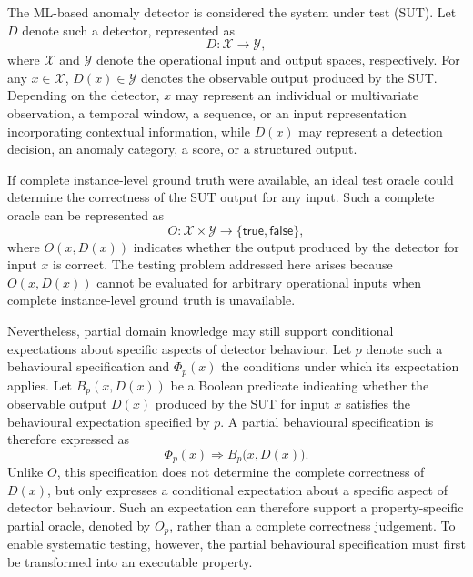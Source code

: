 \documentclass[preprint,12pt]{elsarticle}
\begin{document}
The ML-based anomaly detector is considered the system under test (SUT).
Let \(D\) denote such a detector, represented as
\begin{equation}
    D : \mathcal{X} \rightarrow \mathcal{Y},
    \label{eq:sut}
\end{equation}
where \(\mathcal{X}\) and \(\mathcal{Y}\) denote the operational input and
output spaces, respectively. For any \(x \in \mathcal{X}\),
\(D(x) \in \mathcal{Y}\) denotes the observable output produced by the SUT.
Depending on the detector, \(x\) may represent an individual or multivariate
observation, a temporal window, a sequence, or an input representation
incorporating contextual information, while \(D(x)\) may represent a
detection decision, an anomaly category, a score, or a structured output.

If complete instance-level ground truth were available, an ideal test oracle
could determine the correctness of the SUT output for any input. Such a
complete oracle can be represented as
\begin{equation}
    O :
    \mathcal{X} \times \mathcal{Y}
    \rightarrow
    \{\mathsf{true},\mathsf{false}\},
    \label{eq:complete_oracle}
\end{equation}
where \(O(x,D(x))\) indicates whether the output produced by the detector for
input \(x\) is correct. The testing problem addressed here arises because
\(O(x,D(x))\) cannot be evaluated for arbitrary operational inputs when
complete instance-level ground truth is unavailable.

Nevertheless, partial domain knowledge may still support conditional
expectations about specific aspects of detector behaviour. Let \(p\)
denote such a behavioural specification and \(\Phi_p(x)\) the conditions
under which its expectation applies. Let \(B_p(x,D(x))\) be a Boolean predicate indicating whether the
observable output \(D(x)\) produced by the SUT for input \(x\) satisfies the
behavioural expectation specified by \(p\). A partial behavioural
specification is therefore expressed as
\begin{equation}
    \Phi_p(x)
    \Rightarrow
    B_p\bigl(x,D(x)\bigr).
    \label{eq:behavioural_specification}
\end{equation}
Unlike \(O\), this specification does not determine the complete correctness
of \(D(x)\), but only expresses a conditional expectation about a specific
aspect of detector behaviour. Such an expectation can therefore support
a property-specific partial oracle, denoted by \(O_p\), rather than a complete
correctness judgement. To enable systematic testing, however, the partial
behavioural specification must first be transformed into an executable property.
\end{document}
